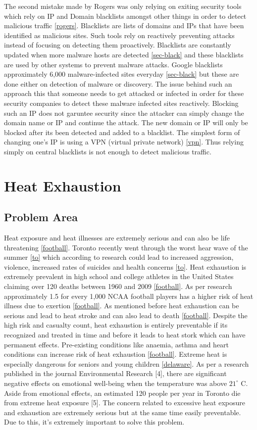 \documentclass{article}
\begin{document}
The second mistake made by Rogers was only relying on exiting security tools which rely on IP and Domain blacklists amongst other things in order to detect malicious traffic \ref{rogers}. Blacklists are lists of domains and IPs that have been identified as malicious sites. Such tools rely on reactively preventing attacks instead of focusing on detecting them proactively. Blacklists are constantly updated when more malware hosts are detected \ref{sec-black} and these blacklists are used by other systems to prevent malware attacks. Google blacklists approximately 6,000 malware-infected sites everyday \ref{sec-black} but these are done either on detection of malware or discovery. The issue behind such an approach this that someone needs to get attacked or infected in order for these security companies to detect these malware infected sites reactively. Blocking such an IP does not garuntee security since the attacker can simply change the domain name or IP and continue the attack. The new domain or IP will only be blocked after its been detected and added to a blacklist. The simplest form of changing one's IP is using a VPN (virtual private network) \ref{vpn}. Thus relying simply on central blacklists is not enough to detect malicious traffic.

\section{Heat Exhaustion}
\subsection{Problem Area}
Heat exposure and heat illnesses are extremely serious and can also be life threatening \ref{football}. Toronto recently went through the worst hear wave of the summer \ref{to} which according to research could lead to increased aggression, violence, increased rates of suicides and health concerns \ref{to}. Heat exhaustion is extremely prevalent in high school and college athletes in the United States claiming over 120 deaths between 1960 and 2009 \ref{football}. As per research approximately 1.5 for every 1,000 NCAA football players has a higher risk of heat illness due to exertion \ref{football}. As mentioned before heat exhaustion can be serious and lead to heat stroke and can also lead to death \ref{football}. Despite the high risk and casualty count, heat exhaustion is entirely preventable if its recognized and treated in time and before it leads to heat stork which can have permanent effects. Pre-existing conditions like anaemia, asthma and heart conditions can increase risk of heat exhaustion \ref{football}. Extreme heat is especially dangerous for seniors and young children \ref{delaware}. As per a research published in the journal Environmental Research [4], there are significant negative effects on emotional well-being when the temperature was above $21^\circ$ C. Aside from emotional effects, an estimated 120 people per year in Toronto die from extreme heat exposure [5]. The concern related to excessive heat exposure and exhaustion are extremely serious but at the same time easily preventable. Due to this, it's extremely important to solve this problem.
\end{document}
